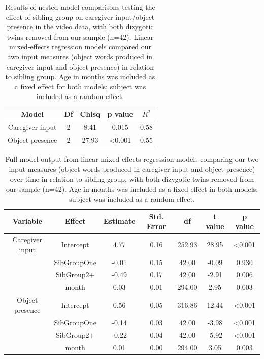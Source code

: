 \documentclass[
  man,mask,floatsintext]{apa6}
\begin{document}
\begin{longtable}[t]{ccccc}
\caption{\label{tab:table-model-comparisons-no-twins}Results of nested model comparisons testing the effect of sibling group on caregiver input/object presence in the video data, with both dizygotic twins removed from our sample (n=42). Linear mixed-effects regression models compared our two input measures (object words produced in caregiver input  and object presence) in relation to sibling group. Age in months was included as a fixed effect for both models; subject was included as a random effect.}\\
\toprule
Model & Df & Chisq & p value & $R^{2}$\\
\midrule
Caregiver input & 2 & 8.41 & 0.015 & 0.58\\
Object presence & 2 & 27.93 & <0.001 & 0.55\\
\bottomrule
\end{longtable}

\begin{longtable}[t]{ccccccc}
\caption{\label{tab:table-input-model-summary-no-twins}Full model output from linear mixed effects regression models comparing our two input measures (object words produced in caregiver input and object presence) over time in relation to sibling group, with both dizygotic twins removed from our sample (n=42). Age in months was included as a fixed effect in both models; subject was included as a random effect.}\\
\toprule
Variable & Effect & Estimate & Std. Error & df & t value & p value\\
\midrule
Caregiver input & Intercept & 4.77 & 0.16 & 252.93 & 28.95 & <0.001\\
 & SibGroupOne & -0.01 & 0.15 & 42.00 & -0.09 & 0.930\\
 & SibGroup2+ & -0.49 & 0.17 & 42.00 & -2.91 & 0.006\\
 & month & 0.03 & 0.01 & 294.00 & 2.95 & 0.003\\
\midrule
Object presence & Intercept & 0.56 & 0.05 & 316.86 & 12.44 & <0.001\\
\addlinespace
 & SibGroupOne & -0.14 & 0.03 & 42.00 & -3.98 & <0.001\\
 & SibGroup2+ & -0.22 & 0.04 & 42.00 & -5.92 & <0.001\\
 & month & 0.01 & 0.00 & 294.00 & 3.05 & 0.003\\
\bottomrule
\end{longtable}

\newpage
\end{document}
